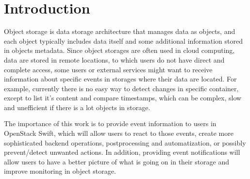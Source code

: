 \documentclass{ExcelAtFIT}
\affiliation{*%
  \href{mailto:xvasil03@stud.fit.vutbr.cz}{xvasil03@stud.fit.vutbr.cz},
  \textit{Faculty of Information Technology, Brno University of Technology}}
\begin{document}
\startdocument



\section{Introduction} \label{introduction}




Object storage is data storage architecture that manages data as objects, and each object typically includes data itself and some additional information stored in objects metadata. Since object storages are often used in cloud computing, data are stored in remote locations, to which users do not have direct and complete access, some users or external services might want to receive information about specific events in storages where their data are located. For example, currently there is no easy way to detect changes in specific container, except to list it's content and compare timestamps, which can be complex, slow and unefficient if there is a lot objects in storage.

The importance of this work is to provide event information to users in OpenStack Swift, which will allow users to react to those events, create more sophisticated backend operations, postprocessing and automatization, or possibly prevent/detect unwanted actions. In addition, providing event notifications will allow users to have a better picture of what is going on in their storage and improve monitoring in object storage.

\end{document}

